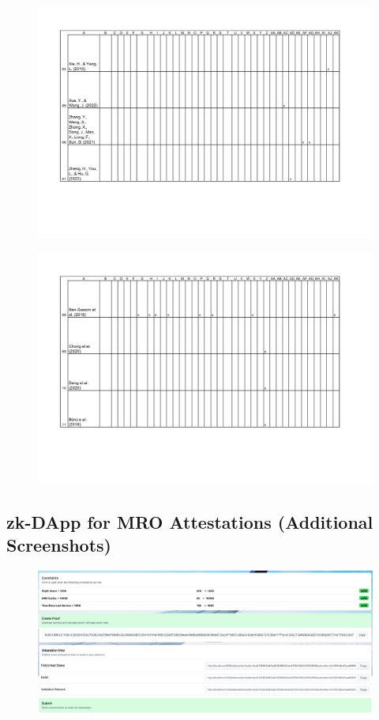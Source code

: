 \begin{figure}[H]
	\centering
		\includegraphics[width=1.0\textwidth]{Pictures/concept_matrix/wos-17.png}
\end{figure}

\begin{figure}[H]
	\centering
		\includegraphics[width=1.0\textwidth]{Pictures/concept_matrix/wos-18.png}
\end{figure}
\newpage
\subsection*{zk-DApp for MRO Attestations (Additional Screenshots)} \label{Appendix B}

\begin{figure}[H]
	\centering
		\includegraphics[width=1.0\textwidth]{Pictures/form_proof_const.png}
\end{figure}

